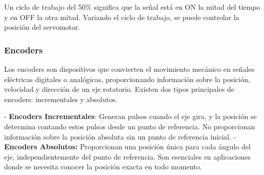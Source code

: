 \documentclass[../main]{subfiles}
\begin{document}
Un ciclo de trabajo del 50\% significa que la señal está en ON la mitad del tiempo y en OFF la otra mitad. Variando el ciclo de trabajo, se puede controlar la posición del servomotor.

\subsubsection*{Encoders}


Los encoders son dispositivos que 
convierten el movimiento mecánico en señales eléctricas digitales o analógicas, proporcionando información sobre la posición, velocidad y dirección de un eje rotatorio. Existen dos tipos principales de encoders: incrementales y absolutos.

- \textbf{Encoders Incrementales}: Generan pulsos cuando el eje gira, y la posición se determina contando estos pulsos desde un punto de referencia. No proporcionan información sobre la posición absoluta sin un punto de referencia inicial.
- \textbf{Encoders Absolutos:} Proporcionan una posición única para cada ángulo del eje, independientemente del punto de referencia. Son esenciales en aplicaciones donde se necesita conocer la posición exacta en todo momento.
\end{document}
